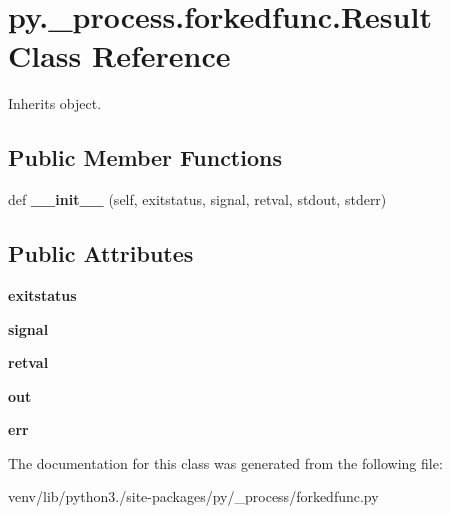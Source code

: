 \hypertarget{classpy_1_1__process_1_1forkedfunc_1_1_result}{}\section{py.\+\_\+process.\+forkedfunc.\+Result Class Reference}
\label{classpy_1_1__process_1_1forkedfunc_1_1_result}


Inherits object.

\subsection*{Public Member Functions}
\begin{DoxyCompactItemize}
\item 
\mbox{\label{classpy_1_1__process_1_1forkedfunc_1_1_result_acaab536d21137af4bda5c66b878e4cd3}} 
def {\bfseries \+\_\+\+\_\+init\+\_\+\+\_\+} (self, exitstatus, signal, retval, stdout, stderr)
\end{DoxyCompactItemize}
\subsection*{Public Attributes}
\begin{DoxyCompactItemize}
\item 
\mbox{\label{classpy_1_1__process_1_1forkedfunc_1_1_result_aec7320030c8de0a63359bbe8c2045119}} 
{\bfseries exitstatus}
\item 
\mbox{\label{classpy_1_1__process_1_1forkedfunc_1_1_result_a7bae1a1a2eb7d481b099f6d9dff0c2f9}} 
{\bfseries signal}
\item 
\mbox{\label{classpy_1_1__process_1_1forkedfunc_1_1_result_a544cad50c2228f28e0b0027ed24cbbd3}} 
{\bfseries retval}
\item 
\mbox{\label{classpy_1_1__process_1_1forkedfunc_1_1_result_ad76a66c56d3c04ed9aeca62e8dc6fa11}} 
{\bfseries out}
\item 
\mbox{\label{classpy_1_1__process_1_1forkedfunc_1_1_result_a3542c9676767879b9a3dc321f4ca8d50}} 
{\bfseries err}
\end{DoxyCompactItemize}


The documentation for this class was generated from the following file\+:\begin{DoxyCompactItemize}
\item 
venv/lib/python3./site-\/packages/py/\+\_\+process/forkedfunc.\+py\end{DoxyCompactItemize}
